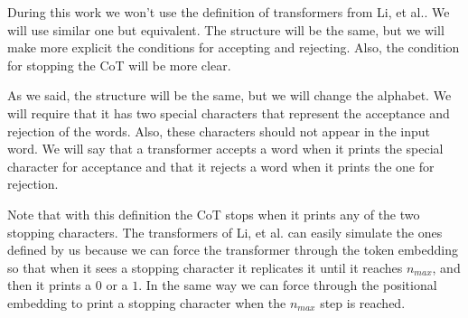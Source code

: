 During this work we won't use the definition of transformers from Li, et al.. We will use similar one but equivalent.
The structure will be the same, but we will make more explicit the conditions for accepting and rejecting. 
Also, the condition for stopping the CoT will be more clear.

As we said, the structure will be the same, but we will change the alphabet. 
We will require that it has two special characters that represent the acceptance and rejection of the words. 
Also, these characters should not appear in the input word.  
We will say that a transformer accepts a word when it prints the special character for acceptance and that it rejects a word when it prints the one for rejection. 

Note that with this definition the CoT stops when it prints any of the two stopping characters. 
The transformers of Li, et al. can easily simulate the ones defined by us because we can force the transformer through the token embedding so that when it sees a stopping character it replicates it until it reaches $n_{max}$, and then it prints a $0$ or a $1$.  
In the same way we can force through the positional embedding to print a stopping character when the $n_{max}$ step is reached.









